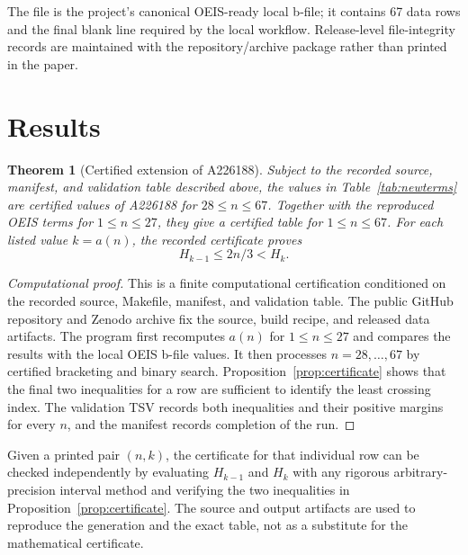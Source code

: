\documentclass[11pt]{article}
\newtheorem{theorem}{Theorem}
\theoremstyle{definition}
\theoremstyle{remark}
\begin{document}
The file  is the project's canonical OEIS-ready local
b-file; it contains 67 data rows and the final blank line required by the
local workflow.  Release-level file-integrity records are maintained with the
repository/archive package rather than printed in the paper.

\section{Results}

\begin{theorem}[Certified extension of A226188]
\label{thm:main}
Subject to the recorded source, manifest, and validation table described
above, the values in Table~\ref{tab:newterms} are certified values of A226188
for \(28\leq n\leq 67\).  Together with the reproduced OEIS terms for
\(1\leq n\leq 27\), they give a certified table for \(1\leq n\leq 67\).
For each listed value \(k=a(n)\), the recorded certificate proves
\[
  H_{k-1}\leq 2n/3 < H_k.
\]
\end{theorem}

\begin{proof}[Computational proof]
This is a finite computational certification conditioned on the recorded
source, Makefile, manifest, and validation table.  The public GitHub
repository and Zenodo archive fix the source, build recipe, and released data
artifacts.
The program first recomputes \(a(n)\) for \(1\leq n\leq 27\) and compares the
results with the local OEIS b-file values.  It then processes \(n=28,\ldots,67\)
by certified bracketing and binary search.  Proposition~\ref{prop:certificate}
shows that the final two inequalities for a row are sufficient to identify the
least crossing index.  The validation TSV records both inequalities and their
positive margins for every \(n\), and the manifest records completion of the
run.
\end{proof}

Given a printed pair \((n,k)\), the certificate for that individual row can be
checked independently by evaluating \(H_{k-1}\) and \(H_k\) with any rigorous
arbitrary-precision interval method and verifying the two inequalities in
Proposition~\ref{prop:certificate}.  The source and output artifacts are used
to reproduce the generation and the exact table, not as a substitute for the
mathematical certificate.
\end{document}
